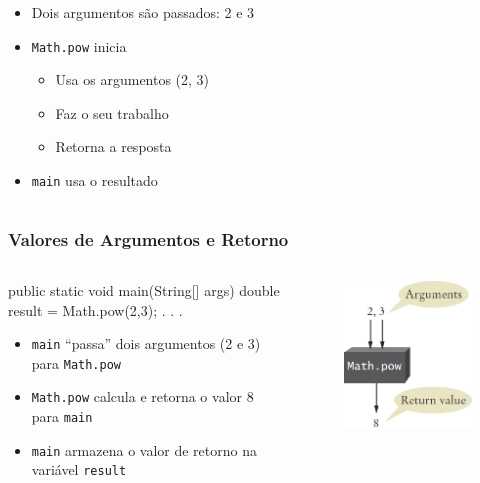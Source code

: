 \documentclass[xcolor={dvipsnames,table},aspectratio=169]{beamer}
\begin{document}
\begin{frame}[fragile]
\begin{columns}[T]
\begin{column}{0.5\linewidth}
\begin{itemize}
\begin{itemize}
				\item Dois argumentos são passados: 2 e 3
				\item \texttt{Math.pow} inicia
				\begin{itemize}
					\item Usa os argumentos (2, 3)
					\item Faz o seu trabalho
					\item Retorna a resposta
				\end{itemize}
				\item \texttt{main} usa o resultado
			\end{itemize}
		\end{itemize}
	\end{column}
\end{columns}
\end{frame}

\begin{frame}[fragile]\frametitle{Valores de Argumentos e Retorno}
\begin{columns}[T]
	\begin{column}{0.5\linewidth}
{\scriptsize
\begin{javacode}
public static void main(String[] args) {
  double result = Math.pow(2,3);
  . . .
}
\end{javacode}
}
		\begin{itemize}
			\item \texttt{main} ``passa'' dois argumentos (2 e 3) para \texttt{Math.pow}
			\item \texttt{Math.pow} calcula e retorna o valor 8 para \texttt{main}
			\item \texttt{main} armazena o valor de retorno na variável \texttt{result}
		\end{itemize}
	\end{column}
	\begin{column}{0.5\linewidth}
\begin{figure}[h]
	\includegraphics[height=0.5\paperheight,center]{pucrs-ep-fprog-unidade_05-metodos-laminas-argumentos_e_retorno.png}
\end{figure}
	\end{column}
\end{columns}
\end{frame}
\end{document}
